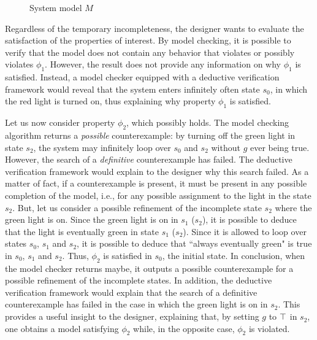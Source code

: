 

\begin{figure}[b]
 \centering

\caption{System model $M$}
\label{fig:modelmot}
\end{figure}


Regardless of the temporary incompleteness, the designer wants to evaluate the satisfaction of the properties of  interest. 
By model checking, it is possible to verify that the model does not contain any behavior that violates or possibly violates $\phi_1$. 
However, the result does not provide any information on why $\phi_1$ is satisfied.
Instead, a model checker equipped with a deductive verification framework would reveal that the system enters infinitely often state $s_0$, in which the red light is turned on, thus explaining why property $\phi_1$ is satisfied.

Let us now consider property $\phi_2$, which possibly holds.
The model checking algorithm returns a \emph{possible} counterexample: by turning off the green light in state $s_2$, the system may infinitely loop over $s_0$ and $s_2$ without $g$ ever being true. 
However, the search of a \emph{definitive} counterexample has failed.
The deductive verification framework would explain to the designer why this search failed.
As a matter of fact, if a counterexample is present, it must be present in any possible completion  of the model, i.e., for any possible assignment to the light in the state $s_2$.
But, let us consider a possible refinement of the incomplete state $s_2$ where the green light is on.
Since the green light is on in $s_1$ ($s_2$), it is possible to deduce that the light is eventually green in state $s_1$ ($s_2$).
Since it is allowed to loop over states $s_0$, $s_1$ and $s_2$, it is possible to deduce that ``always eventually green" is true in $s_0$, $s_1$ and $s_2$.
Thus, $\phi_2$ is satisfied in $s_0$, the initial state.
In conclusion, when the model checker returns maybe, it outputs a possible counterexample for a possible refinement of the incomplete states. 
In addition, the deductive verification framework would explain that the search of a definitive counterexample has failed in the case in which the green light is on in $s_2$.
This provides a useful insight to the designer, explaining that, by setting $g$ to $\operatorname{\top}$ in $s_2$, one obtains a model satisfying $\phi_2$ while, in the opposite case, $\phi_2$ is violated.


